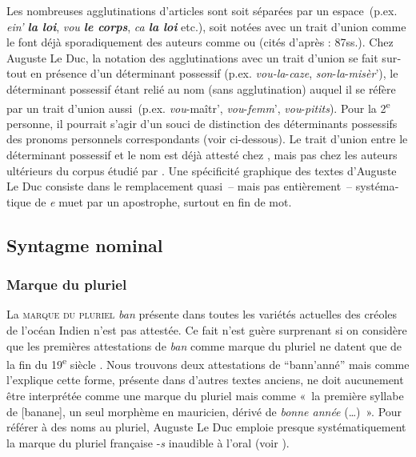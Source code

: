 \documentclass[output=paper]{langscibook}
\begin{document}
\begin{otherlanguage}{french}
Les nombreuses agglutinations d’articles sont soit séparées par un espace~(p.ex. \textit{ein’ \textbf{la loi}}, \textit{vou \textbf{le corps}}, \textit{ca \textbf{la loi}} etc.), soit notées avec un trait d’union comme le font déjà sporadiquement des auteurs comme \citet{Chrestien1822} ou \citet{Freycinet1827} (cités d’après \citealt{Chaudenson1981} : 87ss.). Chez Auguste Le Duc, la notation des agglutinations avec un trait d’union se fait surtout en présence d’un déterminant possessif (p.ex. \textit{vou-la}{}-\textit{caze}, \textit{son}{}-\textit{la}{}-\textit{misèr}’), le déterminant possessif étant relié au nom (sans agglutination) auquel il se réfère par un trait d’union aussi~(p.ex. \textit{vou}{}-maîtr’, \textit{vou}{}-\textit{femm}’, \textit{vou}{}-\textit{pitits}). Pour la 2\textsuperscript{e} personne, il pourrait s’agir d’un souci de distinction des déterminants possessifs des pronoms personnels correspondants (voir ci-dessous). Le trait d’union entre le déterminant possessif et le nom est déjà attesté chez \citet{Chrestien1818}, mais pas chez les auteurs ultérieurs du corpus étudié par \citealt[13]{BakerEtAl2007}. Une spécificité graphique des textes d’Auguste Le Duc consiste dans le remplacement quasi~– mais pas entièrement~– systématique de \textit{e} muet par un apostrophe, surtout en fin de mot.

\subsection{Syntagme nominal}\label{sec:kriegel:4.2}

\subsubsection{Marque du pluriel}

La \textsc{marque du pluriel} \textit{ban} présente dans toutes les variétés actuelles des créoles de l’océan Indien n’est pas attestée. Ce fait n’est guère surprenant si on considère que les premières attestations de \textit{ban} comme marque du pluriel ne datent que de la fin du 19\textsuperscript{e} siècle \citep{Bollée2000}. Nous trouvons deux attestations de “bann’anné” mais comme l’explique \citet[135ss]{Baker2003} cette forme, présente dans d’autres textes anciens, ne doit aucunement être interprétée comme une marque du pluriel mais comme «~la première syllabe de [banane], un seul morphème en mauricien, dérivé de \textit{bonne année} (…)~». Pour référer à des noms au pluriel, Auguste Le Duc emploie presque systématiquement la marque du pluriel française -\textit{s} inaudible à l’oral (voir ).


\end{otherlanguage}
\end{document}
